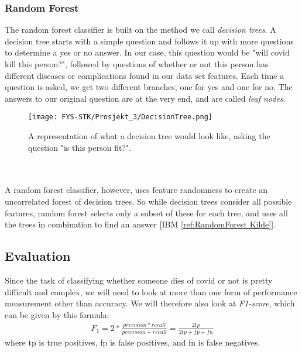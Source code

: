 \documentclass[english,notitlepage,reprint,nofootinbib]{revtex4-1}  %
\begin{document}
\subsubsection{Random Forest}
The random forest classifier is built on the method we call \textit{decision trees}. A decision tree starts with a simple question and follows it up with more questions to determine a yes or no answer. In our case, this question would be "will covid kill this person?", followed by questions of whether or not this person has different diseases or complications found in our data set features. Each time a question is asked, we get two different branches, one for yes and one for no. The answers to our original question are at the very end, and are called \textit{leaf nodes}. 
\begin{figure}[H]
    \centering
    \texttt{[image: FYS-STK/Prosjekt\_3/DecisionTree.png]}
    \caption{A representation of what a decision tree would look like, asking the question "is this person fit?".}
    \label{fig: 2}
\end{figure}
\\
\\
A random forest classifier, however, uses feature randomness to create an uncorrelated forest of decision trees. So while decision trees consider all possible features, random forest selects only a subset of these for each tree, and uses all the trees in combination to find an answer [IBM \ref{ref:RandomForest Kilde}].




\subsection{Evaluation}
Since the task of classifying whether someone dies of covid or not is pretty difficult and complex, we will need to look at more than one form of performance measurement other than accuracy. We will therefore also look at \textit{F1-score}, which can be given by this formula:
\begin{align}
    F_1 = 2*\frac{precision*recall}{precision + recall} = \frac{2tp}{2tp + fp + fn}
\end{align}
where tp is true positives, fp is false positives, and fn is false negatives.
\end{document}
